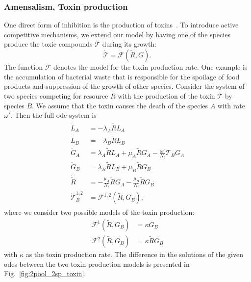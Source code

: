 \documentclass[10pt,1p,authoryear]{elsarticle}
\numberwithin{equation}{section}
\begin{document}
\subsubsection{Amensalism, Toxin production}
\label{section:toxin-production}
One direct form of inhibition is the production of toxins~\citep{cotterBacteriocinsDeveloping2005, rileyBacteriocinsEvolution2002}.
To introduce active competitive mechanisms, we extend our model by having one of the species produce the toxic compounds $\mathcal{T}$ during its growth:
\begin{equation}
    \dot{\mathcal{T}} = \mathcal{F}(\tilde{R},G).
\end{equation}
The function $\mathcal{F}$ denotes the model for the toxin production rate.
One example is the accumulation of bacterial waste that is responsible for the spoilage of food products and suppression of the growth of other species.
Consider the system of two species competing for resource $\tilde{R}$ with the production of the toxin $\mathcal{T}$ by species $B$.
We assume that the toxin causes the death of the species $A$ with rate $\omega'$.
Then the full \ac{ode} system is
\begin{align}
    \begin{split}
        \dot{L}_A &= - \lambda_A \tilde{R} L_A\\
        \dot{L}_B &= - \lambda_B \tilde{R} L_B \\
        \dot{G}_A &= \lambda_A \tilde{R} L_A + \mu_A \tilde{R} G_A - \frac{\omega'}{N_t} \mathcal{T}_B G_A\\
        \dot{G}_B &= \lambda_B \tilde{R} L_B + \mu_B \tilde{R} G_B\\
        \dot{\tilde{R}} &= -\frac{\mu_A}{N_t} \tilde{R} G_A-\frac{\mu_B}{N_t} \tilde{R} G_B\\
        \dot{\mathcal{T}}_{B}^{1,2} &= \mathcal{F}^{1,2} (\tilde{R}, G_B),
    \end{split}
    \label{eq:model_2sp_toxin}
\end{align}
%
where we consider two possible models of the toxin production:
\begin{align}
    \mathcal{F}^1(\tilde{R},G_B)&=\kappa G_B\\
    \mathcal{F}^2(\tilde{R},G_B)&=\kappa \tilde{R} G_B
\end{align}
with $\kappa$ as the toxin production rate.
The difference in the solutions of the given \acp{ode} between the two toxin production models is presented in Fig.~\ref{fig:2pool_2sp_toxin}.
%
%
\end{document}
